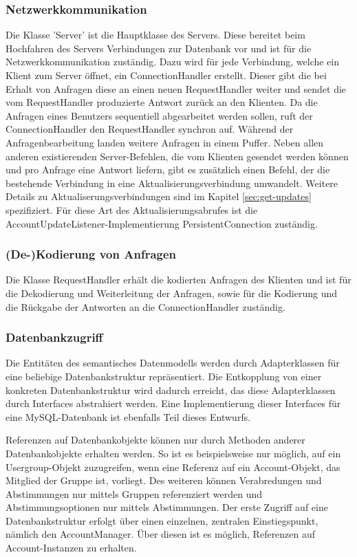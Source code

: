 \documentclass[parskip=full,11pt]{scrartcl}
\begin{document}
\subsubsection{Netzwerkkommunikation}
Die Klasse 'Server' ist die Hauptklasse des Servers.
Diese bereitet beim Hochfahren des Servers Verbindungen zur Datenbank vor und
ist für die Netzwerkkommunikation zuständig.
Dazu wird für jede Verbindung, welche ein Klient zum Server öffnet,
ein ConnectionHandler erstellt.
Dieser gibt die bei Erhalt von Anfragen diese an einen neuen RequestHandler
weiter und sendet die vom RequestHandler produzierte Antwort zurück an den
Klienten.
Da die Anfragen eines Benutzers sequentiell abgearbeitet werden sollen, ruft
der ConnectionHandler den RequestHandler synchron auf.
Während der Anfragenbearbeitung landen weitere Anfragen in einem Puffer.
Neben allen anderen existierenden Server-Befehlen, die vom Klienten gesendet
werden können und pro Anfrage eine Antwort liefern, gibt es zusätzlich einen
Befehl, der die bestehende Verbindung in eine Aktualisierungsverbindung
umwandelt.
Weitere Details zu Aktualiserungsverbindungen sind im Kapitel
\ref{sec:get-updates} spezifiziert.
Für diese Art des Aktualisierungsabrufes ist die
AccountUpdateListener-Implementierung PersistentConnection zuständig.

\subsubsection{(De-)Kodierung von Anfragen}
Die Klasse RequestHandler erhält die kodierten Anfragen des Klienten und
ist für die Dekodierung und Weiterleitung der Anfragen, sowie für
die Kodierung und die Rückgabe der Antworten an die ConnectionHandler zuständig.

\subsubsection{Datenbankzugriff}
Die Entitäten des semantisches Datenmodells werden durch Adapterklassen für
eine beliebige Datenbankstruktur repräsentiert.
Die Entkopplung von einer konkreten Datenbankstruktur wird dadurch erreicht,
das diese Adapterklassen durch Interfaces abstrahiert werden.
Eine Implementierung dieser Interfaces für eine MySQL-Datenbank ist ebenfalls
Teil dieses Entwurfs.

\par Referenzen auf Datenbankobjekte können nur durch Methoden anderer
Datenbankobjekte erhalten werden.
So ist es beispielsweise nur möglich, auf ein Usergroup-Objekt zuzugreifen,
wenn eine Referenz auf ein Account-Objekt, das Mitglied der Gruppe ist,
vorliegt.
Des weiteren können Verabredungen und Abstimmungen nur mittels Gruppen
referenziert werden und Abstimmungsoptionen nur mittels Abstimmungen.
Der erste Zugriff auf eine Datenbankstruktur erfolgt über einen einzelnen,
zentralen Einstiegspunkt, nämlich den AccountManager.
Über diesen ist es möglich, Referenzen auf Account-Instanzen zu erhalten.
\end{document}
